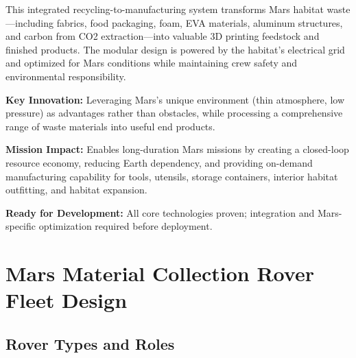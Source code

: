 \documentclass[12pt, a4paper]{article}
\begin{document}
This integrated recycling-to-manufacturing system transforms Mars habitat waste—including fabrics, food packaging, foam, EVA materials, aluminum structures, and carbon from CO2 extraction—into valuable 3D printing feedstock and finished products. The modular design is powered by the habitat's electrical grid and optimized for Mars conditions while maintaining crew safety and environmental responsibility.

\textbf{Key Innovation:} Leveraging Mars's unique environment (thin atmosphere, low pressure) as advantages rather than obstacles, while processing a comprehensive range of waste materials into useful end products.

\textbf{Mission Impact:} Enables long-duration Mars missions by creating a closed-loop resource economy, reducing Earth dependency, and providing on-demand manufacturing capability for tools, utensils, storage containers, interior habitat outfitting, and habitat expansion.

\textbf{Ready for Development:} All core technologies proven; integration and Mars-specific optimization required before deployment.

\section{Mars Material Collection Rover Fleet Design}

\subsection{Rover Types and Roles}
\end{document}
